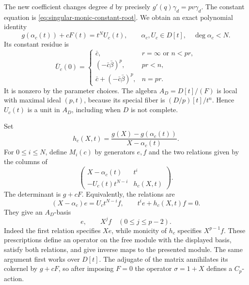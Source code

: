 The new coefficient changes degree \(d\) by precisely
\(g'(q)\gamma_d=pv\gamma_d\).  The constant equation is
\eqref{eq:singular-monic-constant-root}.  We obtain an exact
polynomial identity
\begin{equation}\label{eq:singular-monic-polynomial-root}
 g(\alpha_c(t))+cF(t)=t^NU_c(t),\qquad
 \alpha_c,U_c\in D[t],\quad\deg\alpha_c<N.
\end{equation}
Its constant residue is
\begin{equation}\label{eq:singular-monic-unit-residue}
 \bar U_c(0)=
 \begin{cases}
 \bar c,&r=\infty\text{ or }n<pr,\\
 (-\bar c\bar\beta)^p,&pr<n,\\
 \bar c+(-\bar c\bar\beta)^p,&n=pr.
 \end{cases}
\end{equation}
It is nonzero by the parameter choices.  The algebra
\(A_D=D[t]/(F)\) is local with maximal ideal \((p,t)\), because
its special fiber is \((D/p)[t]/t^n\).  Hence \(U_c(t)\) is a
unit in \(A_D\), including when \(D\) is not complete.

Set
\[
 h_c(X,t)=\frac{g(X)-g(\alpha_c(t))}{X-\alpha_c(t)}.
\]
For \(0\le i\le N\), define \(M_i(c)\) by generators \(e,f\)
and the two relations given by the columns of
\begin{equation}\label{eq:singular-monic-factorizations}
 \begin{pmatrix}
 X-\alpha_c(t)&t^i\\-U_c(t)t^{N-i}&h_c(X,t)
 \end{pmatrix}.
\end{equation}
The determinant is \(g+cF\).  Equivalently, the relations are
\begin{equation}\label{eq:singular-monic-relations}
 (X-\alpha_c)e=U_ct^{N-i}f,\qquad t^ie+h_c(X,t)f=0.
\end{equation}
They give an \(A_D\)-basis
\begin{equation}\label{eq:singular-monic-free-basis}
 e,\qquad X^jf\quad(0\le j\le p-2).
\end{equation}
Indeed the first relation specifies \(Xe\), while monicity of
\(h_c\) specifies \(X^{p-1}f\).  These prescriptions define an
operator on the free module with the displayed basis, satisfy both
relations, and give inverse maps to the presented module.  The same
argument first works over \(D[t]\).  The adjugate of the matrix
annihilates its cokernel by \(g+cF\), so after imposing \(F=0\)
the operator \(\sigma=1+X\) defines a \(C_p\)-action.

